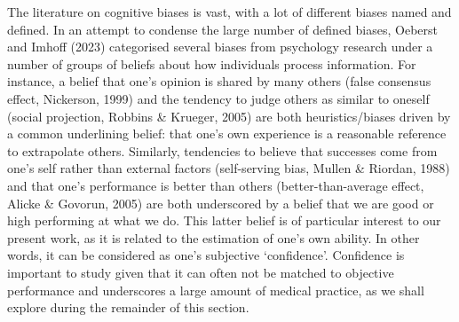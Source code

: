 \documentclass[a4paper, nobind]{templates/ociamthesis}
\begin{document}
\hfill\break
The literature on cognitive biases is vast, with a lot of different biases named and defined. In an attempt to condense the large number of defined biases, Oeberst and Imhoff (2023) categorised several biases from psychology research under a number of groups of beliefs about how individuals process information. For instance, a belief that one's opinion is shared by many others (false consensus effect, Nickerson, 1999) and the tendency to judge others as similar to oneself (social projection, Robbins \& Krueger, 2005) are both heuristics/biases driven by a common underlining belief: that one's own experience is a reasonable reference to extrapolate others. Similarly, tendencies to believe that successes come from one's self rather than external factors (self-serving bias, Mullen \& Riordan, 1988) and that one's performance is better than others (better-than-average effect, Alicke \& Govorun, 2005) are both underscored by a belief that we are good or high performing at what we do. This latter belief is of particular interest to our present work, as it is related to the estimation of one's own ability. In other words, it can be considered as one's subjective `confidence'. Confidence is important to study given that it can often not be matched to objective performance and underscores a large amount of medical practice, as we shall explore during the remainder of this section.
\end{document}
